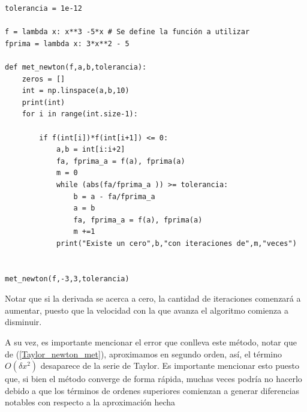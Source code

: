 \begin{lstlisting}
tolerancia = 1e-12

f = lambda x: x**3 -5*x # Se define la función a utilizar
fprima = lambda x: 3*x**2 - 5

def met_newton(f,a,b,tolerancia):
    zeros = []
    int = np.linspace(a,b,10)
    print(int)
    for i in range(int.size-1): 

        if f(int[i])*f(int[i+1]) <= 0:
            a,b = int[i:i+2]
            fa, fprima_a = f(a), fprima(a)
            m = 0
            while (abs(fa/fprima_a )) >= tolerancia:
                b = a - fa/fprima_a
                a = b
                fa, fprima_a = f(a), fprima(a)
                m +=1
            print("Existe un cero",b,"con iteraciones de",m,"veces")


met_newton(f,-3,3,tolerancia)

\end{lstlisting}


Notar que si la derivada se acerca a cero, la cantidad de iteraciones comenzará a aumentar, puesto que la velocidad con la que avanza el algoritmo comienza a disminuir.

A su vez, es importante mencionar el error que conlleva este método, notar que de (\ref{Taylor_newton_met}), aproximamos en segundo orden, así, el término $O(\delta x^2)$ desaparece de la serie de Taylor. Es importante mencionar esto puesto que, si bien el método converge de forma rápida, muchas veces podría no hacerlo debido a que los términos de ordenes superiores comienzan a generar diferencias notables con respecto a la aproximación hecha

